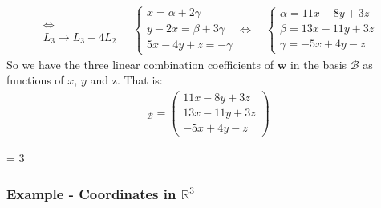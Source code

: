 \documentclass[usenames,dvipsnames,aspectratio=169,10pt]{beamer}
\def \EXAMPLEVERSION {3} %
\numberwithin{equation}{section}
\begin{document}
\begin{frame}

\begin{align*}
\begin{matrix}
 \\
\iff \\
L_3 \to L_3 - 4L_2 
\end{matrix}
%
\quad
\begin{cases}
x =  \alpha + 2\gamma \\
y-2x = \beta + 3\gamma \\
5x -4y + z = -\gamma
\end{cases}
\iff
%
\quad
\begin{cases}
\alpha = 11x - 8y + 3z \\
\beta = 13x - 11y + 3z \\
\gamma = - 5x + 4y - z
\end{cases}
\end{align*}
So we have the three linear combination coefficients of $\mathbf{w}$ in the basis $\mathcal{B}$ as functions of $x$, $y$ and z. That is:
\begin{align*}
[(x,y,z)]_\mathcal{B} = \begin{pmatrix}
11x - 8y + 3z \\
13x - 11y + 3z \\
- 5x + 4y - z
\end{pmatrix}
\end{align*}
\end{frame}
\fi 






\ifnum \EXAMPLEVERSION = 3
\begin{frame}
\frametitle{Example - Coordinates in $\mathbb{R}^3$}
\end{frame}

\begin{frame}
\end{frame}
\fi 
\end{document}
